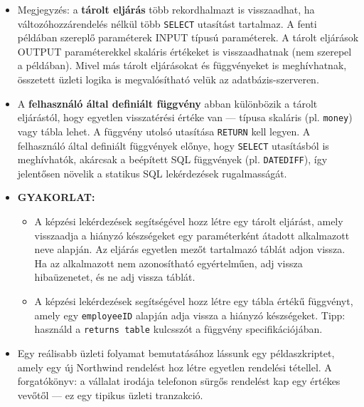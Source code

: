 \documentclass[
  magyar,
]{article}
\providecommand{\tightlist}{%
  \setlength{\itemsep}{0pt}\setlength{\parskip}{0pt}}
\begin{document}
\begin{itemize}
\item
  Megjegyzés: a \textbf{tárolt eljárás} több rekordhalmazt is
  visszaadhat, ha változóhozzárendelés nélkül több \texttt{SELECT}
  utasítást tartalmaz. A fenti példában szereplő paraméterek INPUT
  típusú paraméterek. A tárolt eljárások OUTPUT paraméterekkel skaláris
  értékeket is visszaadhatnak (nem szerepel a példában). Mivel más
  tárolt eljárásokat és függvényeket is meghívhatnak, összetett üzleti
  logika is megvalósítható velük az adatbázis-szerveren.
\item
  A \textbf{felhasználó által definiált függvény} abban különbözik a
  tárolt eljárástól, hogy egyetlen visszatérési értéke van --- típusa
  skaláris (pl. \texttt{money}) vagy tábla lehet. A függvény utolsó
  utasítása \texttt{RETURN} kell legyen. A felhasználó által definiált
  függvények előnye, hogy \texttt{SELECT} utasításból is meghívhatók,
  akárcsak a beépített SQL függvények (pl. \texttt{DATEDIFF}), így
  jelentősen növelik a statikus SQL lekérdezések rugalmasságát.
\item
  \textbf{GYAKORLAT:}

  \begin{itemize}
  \tightlist
  \item
    A képzési lekérdezések segítségével hozz létre egy tárolt eljárást,
    amely visszaadja a hiányzó készségeket egy paraméterként átadott
    alkalmazott neve alapján. Az eljárás egyetlen mezőt tartalmazó
    táblát adjon vissza. Ha az alkalmazott nem azonosítható
    egyértelműen, adj vissza hibaüzenetet, és ne adj vissza táblát.
  \item
    A képzési lekérdezések segítségével hozz létre egy tábla értékű
    függvényt, amely egy \texttt{employeeID} alapján adja vissza a
    hiányzó készségeket. Tipp: használd a \texttt{returns\ table}
    kulcsszót a függvény specifikációjában.
  \end{itemize}
\item
  Egy reálisabb üzleti folyamat bemutatásához lássunk egy
  példaszkriptet, amely egy új Northwind rendelést hoz létre egyetlen
  rendelési tétellel. A forgatókönyv: a vállalat irodája telefonon
  sürgős rendelést kap egy értékes vevőtől --- ez egy tipikus üzleti
  tranzakció.
\end{itemize}
\end{document}
